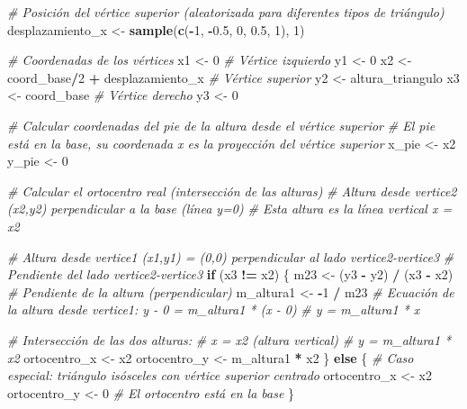\documentclass[
]{article}
\newenvironment{Shaded}{\begin{snugshade}}{\end{snugshade}}
\newcommand{\CommentTok}[1]{\textcolor[rgb]{0.56,0.35,0.01}{\textit{#1}}}
\newcommand{\ControlFlowTok}[1]{\textcolor[rgb]{0.13,0.29,0.53}{\textbf{#1}}}
\newcommand{\DecValTok}[1]{\textcolor[rgb]{0.00,0.00,0.81}{#1}}
\newcommand{\FloatTok}[1]{\textcolor[rgb]{0.00,0.00,0.81}{#1}}
\newcommand{\FunctionTok}[1]{\textcolor[rgb]{0.13,0.29,0.53}{\textbf{#1}}}
\newcommand{\NormalTok}[1]{#1}
\newcommand{\OtherTok}[1]{\textcolor[rgb]{0.56,0.35,0.01}{#1}}
\newcommand{\SpecialCharTok}[1]{\textcolor[rgb]{0.81,0.36,0.00}{\textbf{#1}}}
\begin{document}
\begin{Shaded}
\begin{Highlighting}[]
\CommentTok{\# Posición del vértice superior (aleatorizada para diferentes tipos de triángulo)}
\NormalTok{desplazamiento\_x }\OtherTok{\textless{}{-}} \FunctionTok{sample}\NormalTok{(}\FunctionTok{c}\NormalTok{(}\SpecialCharTok{{-}}\DecValTok{1}\NormalTok{, }\SpecialCharTok{{-}}\FloatTok{0.5}\NormalTok{, }\DecValTok{0}\NormalTok{, }\FloatTok{0.5}\NormalTok{, }\DecValTok{1}\NormalTok{), }\DecValTok{1}\NormalTok{)}

\CommentTok{\# Coordenadas de los vértices}
\NormalTok{x1 }\OtherTok{\textless{}{-}} \DecValTok{0}  \CommentTok{\# Vértice izquierdo}
\NormalTok{y1 }\OtherTok{\textless{}{-}} \DecValTok{0}
\NormalTok{x2 }\OtherTok{\textless{}{-}}\NormalTok{ coord\_base}\SpecialCharTok{/}\DecValTok{2} \SpecialCharTok{+}\NormalTok{ desplazamiento\_x  }\CommentTok{\# Vértice superior}
\NormalTok{y2 }\OtherTok{\textless{}{-}}\NormalTok{ altura\_triangulo}
\NormalTok{x3 }\OtherTok{\textless{}{-}}\NormalTok{ coord\_base  }\CommentTok{\# Vértice derecho}
\NormalTok{y3 }\OtherTok{\textless{}{-}} \DecValTok{0}

\CommentTok{\# Calcular coordenadas del pie de la altura desde el vértice superior}
\CommentTok{\# El pie está en la base, su coordenada x es la proyección del vértice superior}
\NormalTok{x\_pie }\OtherTok{\textless{}{-}}\NormalTok{ x2}
\NormalTok{y\_pie }\OtherTok{\textless{}{-}} \DecValTok{0}

\CommentTok{\# Calcular el ortocentro real (intersección de las alturas)}
\CommentTok{\# Altura desde vertice2 (x2,y2) perpendicular a la base (línea y=0)}
\CommentTok{\# Esta altura es la línea vertical x = x2}

\CommentTok{\# Altura desde vertice1 (x1,y1) = (0,0) perpendicular al lado vertice2{-}vertice3}
\CommentTok{\# Pendiente del lado vertice2{-}vertice3}
\ControlFlowTok{if}\NormalTok{ (x3 }\SpecialCharTok{!=}\NormalTok{ x2) \{}
\NormalTok{  m23 }\OtherTok{\textless{}{-}}\NormalTok{ (y3 }\SpecialCharTok{{-}}\NormalTok{ y2) }\SpecialCharTok{/}\NormalTok{ (x3 }\SpecialCharTok{{-}}\NormalTok{ x2)}
  \CommentTok{\# Pendiente de la altura (perpendicular)}
\NormalTok{  m\_altura1 }\OtherTok{\textless{}{-}} \SpecialCharTok{{-}}\DecValTok{1} \SpecialCharTok{/}\NormalTok{ m23}
  \CommentTok{\# Ecuación de la altura desde vertice1: y {-} 0 = m\_altura1 * (x {-} 0)}
  \CommentTok{\# y = m\_altura1 * x}

  \CommentTok{\# Intersección de las dos alturas:}
  \CommentTok{\# x = x2 (altura vertical)}
  \CommentTok{\# y = m\_altura1 * x2}
\NormalTok{  ortocentro\_x }\OtherTok{\textless{}{-}}\NormalTok{ x2}
\NormalTok{  ortocentro\_y }\OtherTok{\textless{}{-}}\NormalTok{ m\_altura1 }\SpecialCharTok{*}\NormalTok{ x2}
\NormalTok{\} }\ControlFlowTok{else}\NormalTok{ \{}
  \CommentTok{\# Caso especial: triángulo isósceles con vértice superior centrado}
\NormalTok{  ortocentro\_x }\OtherTok{\textless{}{-}}\NormalTok{ x2}
\NormalTok{  ortocentro\_y }\OtherTok{\textless{}{-}} \DecValTok{0}  \CommentTok{\# El ortocentro está en la base}
\NormalTok{\}}


\end{Highlighting}
\end{Shaded}
\end{document}
